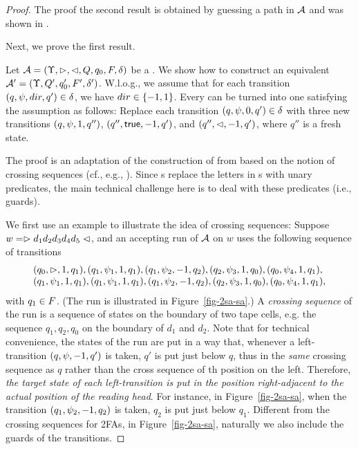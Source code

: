 \begin{proof}
The proof the second result is obtained by guessing a path in $\mathcal{A}$ and was shown in \cite{NG01,DV14}.

Next, we prove the first result.

Let $\mathcal{A} = (\Upsilon, \vartriangleright, \vartriangleleft, Q, q_0, F, \delta)$ be a \SSA. We show how to construct an equivalent \SA{} $\mathcal{A}' =  (\Upsilon, Q', q'_0, F', \delta')$.
W.l.o.g., we assume that for each transition $(q, \psi, dir, q') \in \delta$, we have $dir \in \{-1,1\}$. Every \SSA{} can be turned into one \SSA{} satisfying the assumption as follows: Replace each transition $(q, \psi, 0, q') \in \delta$ with three new transitions $(q, \psi, 1, q'')$, $(q'', \mathsf{true}, -1, q')$, and $(q'', \vartriangleleft, -1, q')$, where $q''$ is a fresh state.

The proof is an adaptation of the construction of \FA{} from \FFA{} based on the notion of crossing sequences (cf., e.g., \cite{HU79}). Since \SSA{}s replace the letters in \FFA{}s with unary predicates, the main technical challenge here is to deal with these predicates (i.e., guards).

We first use an example to illustrate the idea of crossing sequences: Suppose $w = \vartriangleright d_1 d_2 d_3 d_4 d_5\vartriangleleft$, and an accepting run of $\mathcal{A}$ on $w$ uses the following sequence of transitions 
\[
\begin{array}{l}
(q_0, \vartriangleright, 1, q_1), (q_1, \psi_1, 1, q_1), (q_1, \psi_2, -1, q_2), (q_2, \psi_3, 1, q_0), (q_0, \psi_4, 1, q_1), \\
(q_1, \psi_1, 1, q_1), (q_1, \psi_1, 1, q_1), (q_1, \psi_2, -1, q_2), (q_2, \psi_3, 1, q_0), (q_0, \psi_4, 1, q_1),
\end{array}
\] 
with $q_1 \in F$.
(The run is illustrated in Figure~\ref{fig-2sa-sa}.) A \emph{crossing sequence} of the run is a sequence of states on the boundary of two tape cells, e.g. the sequence $q_1, q_2, q_0$ on the boundary of $d_1$ and $d_2$. Note that for technical convenience, the states of the run are put in a way that, whenever a left-transition $(q, \psi, -1, q')$ is taken, $q'$ is put just below $q$, thus in the \emph{same} crossing sequence as $q$ rather than the cross sequence of th position on the left. Therefore, 
\emph{the target state of each left-transition is put in the position right-adjacent to the actual position of the reading head}.
For instance, in Figure~\ref{fig-2sa-sa}, when the transition $(q_1, \psi_2, -1, q_2)$ is taken, $q_2$ is put just below $q_1$. Different from the crossing sequences for 2FAs, in Figure~\ref{fig-2sa-sa}, naturally we also include the guards of the transitions. 


\end{proof}
